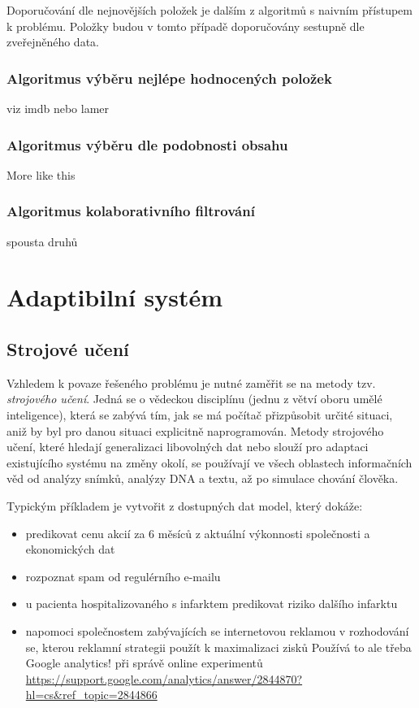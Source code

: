 \documentclass[thesis=M,czech]{FITthesis}[2014/05/07]
\begin{document}
Doporučování dle nejnovějších položek je dalším z algoritmů s naivním přístupem k problému. Položky budou v tomto případě doporučovány sestupně dle zveřejněného data.

\subsection{Algoritmus výběru nejlépe hodnocených položek}

viz imdb nebo lamer

\subsection{Algoritmus výběru dle podobnosti obsahu}

More like this

\subsection{Algoritmus kolaborativního filtrování}

spousta druhů

\chapter{Adaptibilní systém}
\label{chap:adapt}

\section{Strojové učení}

Vzhledem k povaze řešeného problému je nutné zaměřit se na metody tzv. \emph{strojového učení}. 
Jedná se o vědeckou disciplínu (jednu z větví oboru umělé inteligence), která se zabývá tím, jak se má počítač přizpůsobit určité situaci, aniž by byl pro danou situaci explicitně naprogramován. Metody strojového učení, které hledají generalizaci libovolných dat nebo slouží pro adaptaci existujícího systému na změny okolí, se používají ve všech oblastech informačních věd od analýzy snímků, analýzy DNA a textu, až po simulace chování člověka. 

Typickým příkladem je vytvořit z dostupných dat model, který dokáže:

\begin{itemize}
  \item predikovat cenu akcií za 6 měsíců z aktuální výkonnosti společnosti a ekonomických dat
  \item rozpoznat spam od regulérního e-mailu
  \item u pacienta hospitalizovaného s infarktem predikovat riziko dalšího infarktu
  \item napomoci společnostem zabývajících se internetovou reklamou v rozhodování se, kterou reklamní strategii použít k maximalizaci zisků
  Používá to ale třeba Google analytics! při správě online experimentů
\url{https://support.google.com/analytics/answer/2844870?hl=cs&ref_topic=2844866}
\end{itemize}
\end{document}
